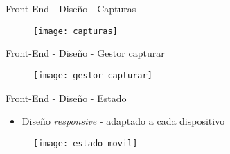 \begin{frame}{Front-End - Diseño - Capturas}
  \begin{figure}
    \texttt{[image: capturas]}
  \end{figure}
\end{frame}

\begin{frame}{Front-End - Diseño - Gestor capturar}
  \begin{figure}
    \texttt{[image: gestor\_capturar]}
  \end{figure}
\end{frame}

\begin{frame}{Front-End - Diseño - Estado}
  \begin{itemize}
    \item Diseño \textit{responsive} - adaptado a cada dispositivo
  \end{itemize}
  \begin{figure}
    \texttt{[image: estado\_movil]}
  \end{figure}
\end{frame}
